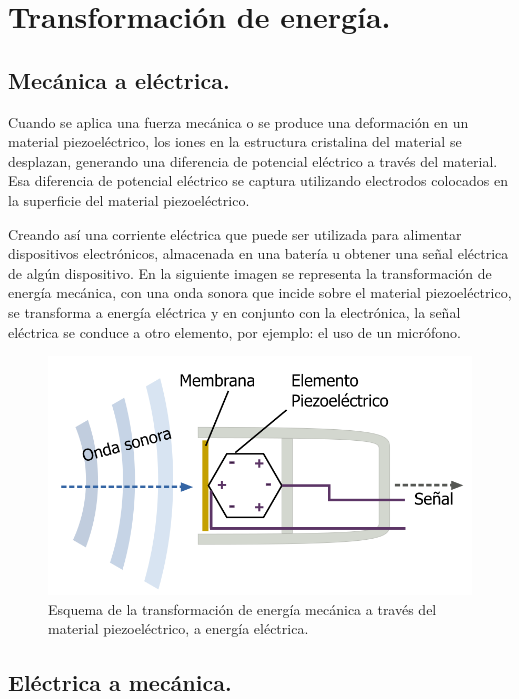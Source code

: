 \documentclass[12pt]{article}
\begin{document}
\section{Transformación de energía.}
\subsection{Mecánica a eléctrica.}

Cuando se aplica una fuerza mecánica o se produce una deformación en un material piezoeléctrico, los iones en la estructura cristalina del material se desplazan, generando una diferencia de potencial eléctrico a través del material. Esa diferencia de potencial eléctrico se captura utilizando electrodos colocados en la superficie del material piezoeléctrico.

Creando así una corriente eléctrica que puede ser utilizada para alimentar dispositivos electrónicos,  almacenada en una batería u obtener una señal eléctrica de algún dispositivo. En la siguiente imagen se representa la transformación de energía mecánica, con una onda sonora que incide sobre el material piezoeléctrico, se transforma a energía eléctrica y en conjunto con la electrónica, la señal eléctrica se conduce a otro elemento, por ejemplo: el uso de un micrófono.
\begin{figure}[H]
    \centering
    \includegraphics[scale=0.5]{Imagenes/Piezoelectricidad_05.png}
    \caption{Esquema de la transformación de energía mecánica a través del material piezoeléctrico, a energía eléctrica.}
\end{figure}

\subsection{Eléctrica a mecánica.}
\end{document}
